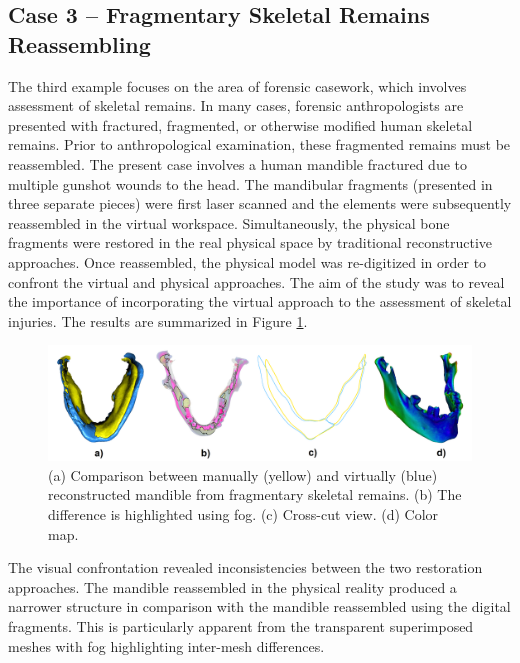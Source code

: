 \documentclass[final,5p,times]{elsarticle}
\begin{document}
\subsection{Case 3 -- Fragmentary Skeletal Remains Reassembling}
The third example focuses on the area of forensic casework, which involves assessment of skeletal remains. 
In many cases, forensic anthropologists are presented with fractured, fragmented, or otherwise modified human skeletal remains. 
Prior to anthropological examination, these fragmented remains must be reassembled. 
The present case involves a human mandible fractured due to multiple gunshot wounds to the head. 
The mandibular fragments (presented in three separate pieces) were first laser scanned and the elements were subsequently reassembled in the virtual workspace.
Simultaneously, the physical bone fragments were restored in the real physical space by traditional reconstructive approaches.
Once reassembled, the physical model was re-digitized in order to confront the virtual and physical approaches. 
The aim of the study was to reveal the importance of incorporating the virtual approach to the assessment of skeletal injuries. 
The results are summarized in Figure \ref{fig:case3}.

\begin{figure}[htb]
	\centering
  \includegraphics[width=1\linewidth]{pictures/case3.png}
  \caption{\label{fig:case3} (a) Comparison between manually (yellow) and virtually (blue) reconstructed mandible from fragmentary skeletal remains. (b) The difference is highlighted using fog. (c) Cross-cut view. (d) Color map.}
\end{figure}

The visual confrontation revealed inconsistencies between the two restoration approaches. 
The mandible reassembled in the physical reality produced a narrower structure in comparison with the mandible reassembled using the digital fragments. 
This is particularly apparent from the transparent superimposed meshes with fog highlighting inter-mesh differences. 
 
\end{document}
